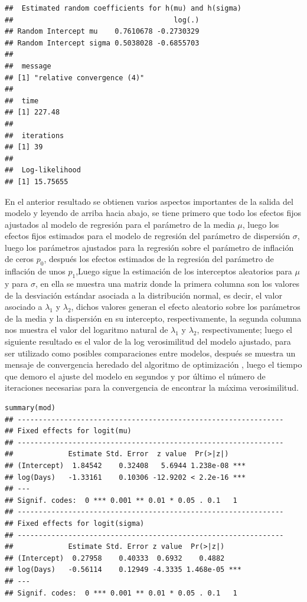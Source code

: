 \begin{verbatim}
##  Estimated random coefficients for h(mu) and h(sigma) 
##                                      log(.)
## Random Intercept mu    0.7610678 -0.2730329
## Random Intercept sigma 0.5038028 -0.6855703
## 
##  message 
## [1] "relative convergence (4)"
## 
##  time 
## [1] 227.48
## 
##  iterations 
## [1] 39
## 
##  Log-likelihood 
## [1] 15.75655
\end{verbatim}

En el anterior resultado se obtienen varios aspectos importantes de la salida del modelo y leyendo de arriba hacia abajo, se tiene primero que todo los efectos fijos ajustados al modelo de regresi\'{o}n para el par\'{a}metro de la media $\mu$, luego los efectos fijos estimados para el modelo de regresi\'{o}n del par\'{a}metro de dispersi\'{o}n $\sigma$, luego los par\'{a}metros ajustados para la regresi\'{o}n sobre el par\'{a}metro de inflaci\'{o}n de ceros $p_0$, despu\'{e}s los efectos estimados de la regresi\'{o}n del par\'{a}metro de inflaci\'{o}n de unos $p_1$,Luego sigue la estimaci\'{o}n de los interceptos aleatorios para $\mu$ y para $\sigma$, en ella se muestra una matriz donde la primera columna son los valores de la desviaci\'{o}n est\'{a}ndar asociada a la distribuci\'{o}n normal, es decir, el valor asociado a $\lambda_1$ y $\lambda_2$, dichos valores generan el efecto aleatorio sobre los par\'{a}metros de la media y la dispersi\'{o}n en su intercepto, respectivamente, la segunda columna nos muestra el valor del logaritmo natural de $\lambda_1$ y $\lambda_2$, respectivamente; luego el siguiente resultado es el valor de la log verosimilitud del modelo ajustado, para ser utilizado como posibles comparaciones entre modelos, despu\'{e}s se muestra un mensaje de convergencia heredado del algoritmo de optimizaci\'{o}n , luego el tiempo que demoro el ajuste del modelo en segundos y por \'{u}ltimo el n\'{u}mero de iteraciones necesarias para la convergencia de encontrar la m\'{a}xima verosimilitud.

\begin{verbatim}
summary(mod)
## ---------------------------------------------------------------
## Fixed effects for logit(mu) 
## ---------------------------------------------------------------
##             Estimate Std. Error  z value  Pr(>|z|)    
## (Intercept)  1.84542    0.32408   5.6944 1.238e-08 ***
## log(Days)   -1.33161    0.10306 -12.9202 < 2.2e-16 ***
## ---
## Signif. codes:  0 *** 0.001 ** 0.01 * 0.05 . 0.1   1
## ---------------------------------------------------------------
## Fixed effects for logit(sigma) 
## ---------------------------------------------------------------
##             Estimate Std. Error z value  Pr(>|z|)    
## (Intercept)  0.27958    0.40333  0.6932    0.4882    
## log(Days)   -0.56114    0.12949 -4.3335 1.468e-05 ***
## ---
## Signif. codes:  0 *** 0.001 ** 0.01 * 0.05 . 0.1   1
\end{verbatim}

